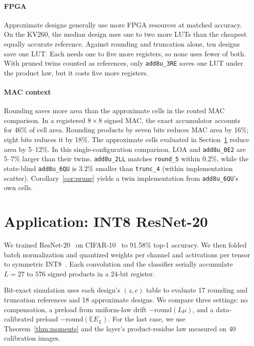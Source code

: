 \documentclass[preprint,12pt,numbers]{elsarticle}
\newcommand{\E}{\mathbb{E}}
\theoremstyle{definition}
\begin{document}
\paragraph{FPGA}
Approximate designs generally use more FPGA resources at matched
accuracy. On the KV260, the median design uses one to two more LUTs
than the cheapest equally accurate reference. Against rounding and
truncation alone, ten designs save one LUT. Each needs one to five
more registers, so none uses fewer of both. With pruned twins counted
as references, only \texttt{add8u\_3RE} saves one LUT under the product
law, but it costs five more registers.

\paragraph{MAC context}
Rounding saves more area than the approximate cells in the routed
MAC comparison. In a registered $8\times8$ signed MAC, the exact
accumulator accounts for 46\% of cell area. Rounding products by
seven bits reduces MAC area by 16\%; eight bits reduces it by 18\%.
The approximate cells evaluated in Section~\ref{sec:cnn} reduce
area by 5--12\%. In this single-configuration comparison, LOA and
\texttt{add8u\_0E2} are 5--7\% larger than their twins.
\texttt{add8u\_2LL} matches \texttt{round\_5} within 0.2\%, while
the state-blind \texttt{add8u\_6QU} is 3.2\% smaller than
\texttt{trunc\_4} (within implementation scatter).
Corollary~\ref{cor:prune} yields a twin implementation from
\texttt{add8u\_6QU}'s own cells.

\section{Application: INT8 ResNet-20}
\label{sec:cnn}

We trained ResNet-20~\cite{he2016resnet} on
CIFAR-10~\cite{krizhevsky2009cifar} to 91.58\% top-1 accuracy.
We then folded batch normalization and quantized weights per channel
and activations per tensor to symmetric INT8~\cite{jacob2018quant}.
Each convolution and the classifier serially accumulate $L=27$ to
$576$ signed products in a 24-bit register.

Bit-exact simulation uses each design's $(z,c)$ table to evaluate 17
rounding and truncation references and 18 approximate designs. We compare
three settings: no compensation, a preload from uniform-law drift
$-\mathrm{round}(L\mu)$, and a data-calibrated preload
$-\mathrm{round}(\E E_L)$. For the last case, we use
Theorem~\ref{thm:moments} and the layer's product-residue law measured on 40
calibration images.
\end{document}
